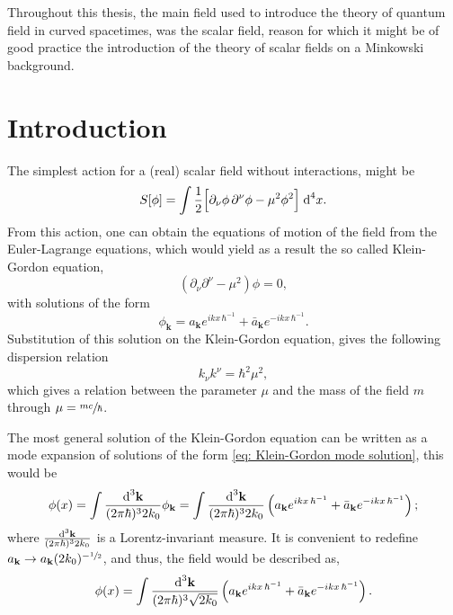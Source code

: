 Throughout this thesis, the main field used to introduce the theory of quantum field in curved spacetimes, was the scalar field, reason for which it might be of good practice the introduction of the theory of scalar fields on a Minkowski background.
\section*{Introduction}
The simplest action for a (real) scalar field without interactions, might be 
\begin{equation}\label{eq: Minkowski scalar action}
	S[\phi]=\int\frac{1}{2}\Big[\partial_\nu\phi\,\partial^\nu\phi-\mu^2\phi^2\Big]\;\text{d}^4 x.
\end{equation}
From this action, one can obtain the equations of motion of the field from the Euler-Lagrange equations, which would yield as a result the so called Klein-Gordon equation,
\begin{equation}
	\left(\partial_\nu\partial^\nu-\mu^2\right)\phi=0,
\end{equation}
with solutions of the form
\begin{equation}\label{eq: Klein-Gordon mode solution}
	\phi_\mathbf{k}=a_\mathbf{k}e^{ikx\,\hbar^{-1}}+\bar a_\mathbf{k}e^{-ikx\,\hbar^{-1}}.
\end{equation}
Substitution of this solution on the Klein-Gordon equation, gives the following dispersion relation
\begin{equation}
	k_\nu k^\nu=\hbar^2\mu^2,
\end{equation}
which gives a relation between the parameter $\mu$ and the mass of the field $m$ through $\mu=\sfrac{mc}{\hbar}$.

The most general solution of the Klein-Gordon equation can be written as a mode expansion of solutions of the form \ref{eq: Klein-Gordon mode solution}, this would be
\begin{equation}
	\phi(x)=\int\frac{\text{d}^3\mathbf{k}}{(2\pi\hbar)^32k_0}\phi_{\mathbf{k}}=\int\frac{\text{d}^3\mathbf{k}}{(2\pi\hbar)^32k_0}\left(a_\mathbf{k}e^{ikx\,\hbar^{-1}}+\bar a_\mathbf{k}e^{-ikx\,\hbar^{-1}}\right);
\end{equation}
where $\frac{\text{d}^3\mathbf{k}}{(2\pi\hbar)^32k_0}$ is a Lorentz-invariant measure. It is convenient to redefine $a_\mathbf{k}\to a_\mathbf{k}(2k_0)^{-\sfrac{1}{2}}$, and thus, the field would be described as,
\begin{equation}
	\phi(x)=\int\frac{\text{d}^3\mathbf{k}}{(2\pi\hbar)^3\sqrt{2k_0}}\left(a_\mathbf{k}e^{ikx\,\hbar^{-1}}+\bar a_\mathbf{k}e^{-ikx\,\hbar^{-1}}\right).
\end{equation}
